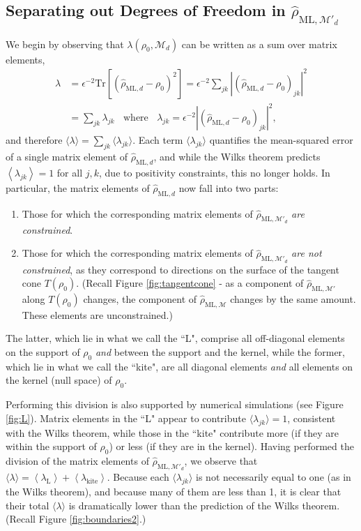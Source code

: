 \documentclass[aps,pra, twocolumn]{revtex4-1}
\newcommand{\M}{\mathcal{M}}
\newcommand{\expect}[1]{\ensuremath{\left\langle#1\right\rangle}}
\newcommand{\rhohat}{\hat{\rho}}
\newcommand{\rhoML}[1]{\rhohat_{\scriptscriptstyle{\mathrm{ML},#1}}}
\begin{document}
\subsection{Separating out Degrees of Freedom in $\rhoML{\M'_{d}}$}
\label{subsec:dof}
We begin by observing that $\lambda(\rho_{0}, \M_{d})$ can be written as a sum over matrix elements,
\begin{align}
\nonumber \lambda &=\epsilon^{-2}\mathrm{Tr}[(\rhoML{d} - \rho_{0})^{2}] = \epsilon^{-2}\sum_{jk}|(\rhoML{d}- \rho_{0} )_{jk}|^{2}\\
\nonumber &= \sum_{jk}\lambda_{jk}~~~~\text{where}~~~~\lambda_{jk} = \epsilon^{-2}|(\rhoML{d} - \rho_{0} )_{jk} |^{2},
\end{align}
and therefore $\langle \lambda \rangle = \sum_{jk}\langle\lambda_{jk}\rangle$.  Each term $\langle \lambda_{jk}\rangle$ quantifies the mean-squared error of a single matrix element of $\rhoML{d}$, and while the Wilks theorem predicts $\expect{\lambda_{jk}}=1$ for all $j,k$, due to positivity constraints, this no longer holds. In particular, the matrix elements of $\rhoML{d}$ now fall into two parts:

\begin{enumerate}[noitemsep]
\item Those for which the corresponding matrix elements of $\rhoML{\M'_{d}}$ \emph{are constrained}.
\item Those for which the corresponding matrix elements of $\rhoML{\M'_{d}}$ \emph{are not constrained}, as they correspond to directions on the surface of the tangent cone $T(\rho_{0})$. (Recall Figure \ref{fig:tangentcone} - as a component of $\rhoML{\M'}$ along $T(\rho_{0})$ changes, the component of $\rhoML{\M}$ changes by the same amount. These elements are unconstrained.)
\end{enumerate}
The latter, which lie in what we call the ``L", comprise all off-diagonal elements on the support of $\rho_0$ \emph{and} between the support and the kernel, while the former, which lie in what we call the ``kite", are all diagonal elements \emph{and} all elements on the kernel (null space) of $\rho_0$.

Performing this division is also supported by numerical simulations (see Figure \ref{fig:L}). Matrix elements in the ``L" appear to contribute $\langle \lambda_{jk}\rangle = 1$, consistent with the Wilks theorem, while those in the ``kite" contribute more (if they are within the support of $\rho_{0}$) or less (if they are in the kernel).  Having performed the division of the matrix elements of $\rhoML{\M'_{d}}$, we observe that $\langle\lambda\rangle = \expect{\lambda_{\mathrm{L}}} + \expect{\lambda_{\mathrm{kite}}}$. Because each $\langle \lambda_{jk}\rangle$ is not necessarily equal to one (as in the Wilks theorem), and because many of them are less than 1, it is clear that their total $\langle \lambda \rangle$ is dramatically lower than the prediction of the Wilks theorem. (Recall Figure \ref{fig:boundaries2}.)
\end{document}
